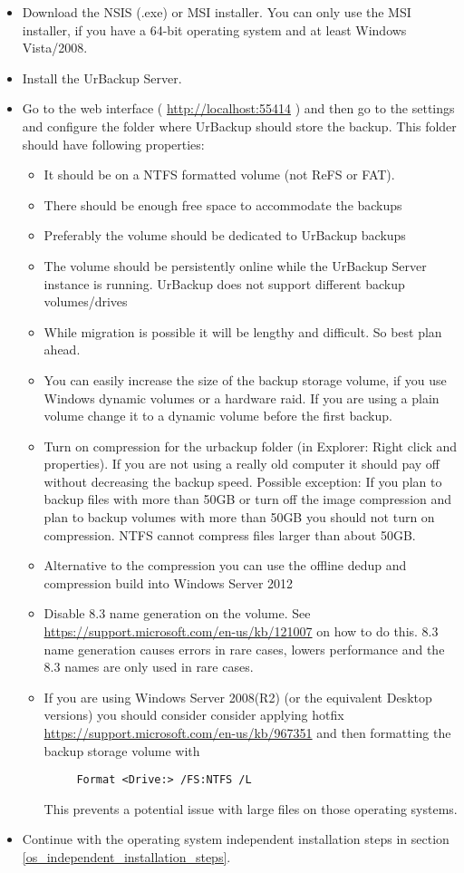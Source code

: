 \documentclass[a4paper,10pt]{article}
\begin{document}
\begin{itemize}
  \item Download the NSIS (.exe) or MSI installer. You can only use the MSI installer, if you have
a 64-bit operating system and at least Windows Vista/2008.
   \item Install the UrBackup Server.
   \item Go to the web interface ( \url{http://localhost:55414} ) and then go to the settings and configure
   the folder where UrBackup should store the backup. This folder should have following properties:
   \begin{itemize}
     \item It should be on a NTFS formatted volume (not ReFS or FAT).
     \item There should be enough free space to accommodate the backups
     \item Preferably the volume should be dedicated to UrBackup backups
     \item The volume should be persistently online while the UrBackup Server instance is running. UrBackup does
     not support different backup volumes/drives
     \item While migration is possible it will be lengthy and difficult. So best plan ahead.
     \item You can easily increase the size of the backup storage volume, if you use Windows dynamic
     volumes or a hardware raid. If you are using a plain volume change it to a dynamic volume before the
     first backup.
     \item Turn on compression for the urbackup folder (in Explorer: Right click and properties). If you are not using a really old computer it should pay off without decreasing the backup speed. Possible exception: If you plan to backup files with more than 50GB or turn off the image compression and plan to backup volumes with more than 50GB you should not turn on compression. NTFS cannot compress files larger than about 50GB.
     \item Alternative to the compression you can use the offline dedup and compression build into Windows Server 2012
     \item Disable 8.3 name generation on the volume. See \url{https://support.microsoft.com/en-us/kb/121007} on how to do this. 8.3 name generation causes errors in rare cases, lowers performance and the 8.3 names are only used in rare cases.
     \item If you are using Windows Server 2008(R2) (or the equivalent Desktop versions) you should consider consider applying hotfix \url{https://support.microsoft.com/en-us/kb/967351} and then formatting the backup storage volume with
 	\begin{verbatim}
     Format <Drive:> /FS:NTFS /L
     \end{verbatim}
     This prevents a potential issue with large files on those operating systems.
   \end{itemize}
   \item Continue with the operating system independent installation steps in section \ref{os_independent_installation_steps}. 
\end{itemize}
\end{document}
